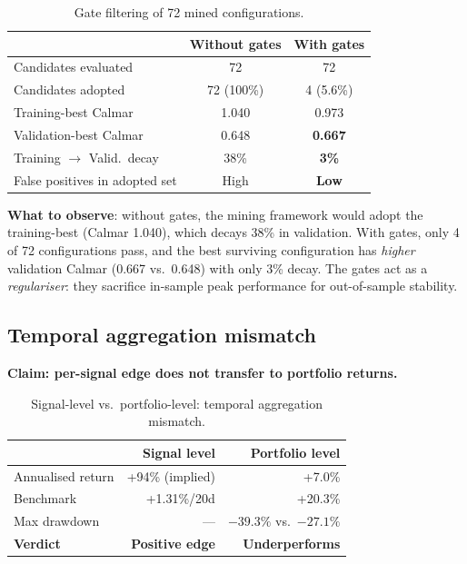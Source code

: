 \documentclass[11pt]{article}
\begin{document}
\begin{table}[htbp]
\centering
\caption{Gate filtering of 72 mined configurations.}
\label{tab:gatefilter}
\small
\begin{tabular}{@{}lcc@{}}
\toprule
 & Without gates & With gates \\
\midrule
Candidates evaluated & 72 & 72 \\
Candidates adopted & 72 (100\%) & 4 (5.6\%) \\
Training-best Calmar & 1.040 & 0.973 \\
Validation-best Calmar & 0.648 & \textbf{0.667} \\
Training $\to$ Valid.\ decay & 38\% & \textbf{3\%} \\
False positives in adopted set & High & \textbf{Low} \\
\bottomrule
\end{tabular}
\end{table}

\textbf{What to observe}: without gates, the mining framework would adopt
the training-best (Calmar 1.040), which decays 38\% in validation. With
gates, only 4 of 72 configurations pass, and the best surviving
configuration has \emph{higher} validation Calmar (0.667 vs.\ 0.648) with
only 3\% decay. The gates act as a \emph{regulariser}: they sacrifice
in-sample peak performance for out-of-sample stability.

\subsection{Temporal aggregation mismatch}
\label{sec:mismatch}

\textbf{Claim: per-signal edge does not transfer to portfolio returns.}

\begin{table}[htbp]
\centering
\caption{Signal-level vs.\ portfolio-level: temporal aggregation mismatch.}
\label{tab:mismatch}
\small
\begin{tabular}{@{}lrr@{}}
\toprule
 & \textbf{Signal level} & \textbf{Portfolio level} \\
\midrule
Annualised return & +94\% (implied) & +7.0\% \\
Benchmark & +1.31\%/20d & +20.3\% \\
Max drawdown & — & $-39.3\%$ vs.\ $-27.1\%$ \\
\midrule
\textbf{Verdict} & \textbf{Positive edge} & \textbf{Underperforms} \\
\bottomrule
\end{tabular}
\end{table}
\end{document}
